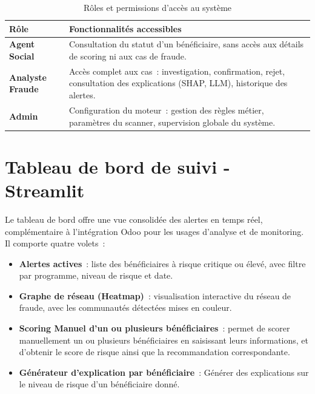 \documentclass[a4paper, oneside, 12pt]{book}
\newcommand{\thead}[1]{\cellcolor{EYdark}\textcolor{white}{\textbf{#1}}}
\renewcommand{\thead}[1]{\cellcolor{EYyellow}\textcolor{EYdark}{\textbf{#1}}}
\begin{document}
\begin{table}[H]
\centering
\caption{Rôles et permissions d'accès au système}
\label{tab:roles-access}
\renewcommand{\arraystretch}{1.4}
\begin{tabular}{>{\bfseries}p{2.8cm} p{9.5cm}}
\hline
\thead{Rôle} & \thead{Fonctionnalités accessibles} \\
\hline
\rowcolor{EYgray}
Agent Social & Consultation du statut d'un bénéficiaire, sans accès aux détails de scoring ni aux cas de fraude. \\
Analyste Fraude & Accès complet aux cas~: investigation, confirmation, rejet, consultation des explications (SHAP, LLM), historique des alertes. \\
\rowcolor{EYgray}
Admin & Configuration du moteur~: gestion des règles métier, paramètres du scanner, supervision globale du système. \\
\hline
\end{tabular}
\end{table}

\section{Tableau de bord de suivi - Streamlit}

\hspace{0.5cm}Le tableau de bord offre une vue consolidée des alertes en temps réel, complémentaire à l'intégration Odoo pour les usages d'analyse et de monitoring. Il comporte quatre volets~:

\begin{itemize}
    \item \textbf{Alertes actives}~: liste des bénéficiaires à risque critique ou élevé, avec filtre par programme, niveau de risque et date.
    \item \textbf{Graphe de réseau (Heatmap)}~: visualisation interactive du réseau de fraude, avec les communautés détectées mises en couleur.
    \item \textbf{Scoring Manuel d'un ou plusieurs bénéficiaires}~: permet de scorer manuellement un ou plusieurs bénéficiaires en saisissant leurs informations, et d'obtenir le score de risque ainsi que la recommandation correspondante.
    \item \textbf{Générateur d'explication par bénéficiaire}~: Générer des explications sur le niveau de risque d'un bénéficiaire donné.

\end{itemize}
\end{document}
